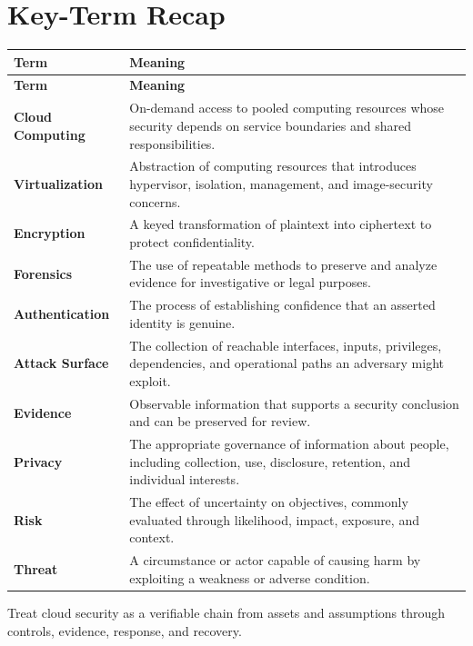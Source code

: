 \documentclass[11pt]{article}
\begin{document}
\section*{Key-Term Recap}
\begin{longtable}{>{\RaggedRight\arraybackslash}p{}>{\RaggedRight\arraybackslash}p{}}
\toprule\rowcolor{Navy}\color{white}\textbf{Term} & \color{white}\textbf{Meaning}\\\midrule
\endfirsthead
\toprule\rowcolor{Navy}\color{white}\textbf{Term} & \color{white}\textbf{Meaning}\\\midrule
\endhead
\textbf{Cloud Computing} & On-demand access to pooled computing resources whose security depends on service boundaries and shared responsibilities. \\\midrule
\textbf{Virtualization} & Abstraction of computing resources that introduces hypervisor, isolation, management, and image-security concerns. \\\midrule
\textbf{Encryption} & A keyed transformation of plaintext into ciphertext to protect confidentiality. \\\midrule
\textbf{Forensics} & The use of repeatable methods to preserve and analyze evidence for investigative or legal purposes. \\\midrule
\textbf{Authentication} & The process of establishing confidence that an asserted identity is genuine. \\\midrule
\textbf{Attack Surface} & The collection of reachable interfaces, inputs, privileges, dependencies, and operational paths an adversary might exploit. \\\midrule
\textbf{Evidence} & Observable information that supports a security conclusion and can be preserved for review. \\\midrule
\textbf{Privacy} & The appropriate governance of information about people, including collection, use, disclosure, retention, and individual interests. \\\midrule
\textbf{Risk} & The effect of uncertainty on objectives, commonly evaluated through likelihood, impact, exposure, and context. \\\midrule
\textbf{Threat} & A circumstance or actor capable of causing harm by exploiting a weakness or adverse condition. \\\midrule
\bottomrule
\end{longtable}
\begin{takeawaybox}
Treat cloud security as a verifiable chain from assets and assumptions through controls, evidence, response, and recovery.
\end{takeawaybox}
\end{document}
